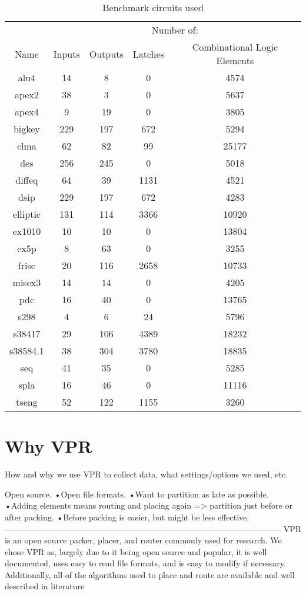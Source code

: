 \documentclass[12pt,draft,a4paper,oneside]{memoir} %
\begin{document}
\begin{table}
    \begin{tabular}{c|cccc}
     & \multicolumn{4}{c}{Number of:}\\
     Name & Inputs & Outputs & Latches & Combinational Logic Elements\\
        alu4 & 14 & 8 & 0 & 4574\\
        apex2 & 38 & 3 & 0 & 5637\\
        apex4 & 9 & 19 & 0 & 3805\\     
        bigkey & 229 & 197 & 672 & 5294\\
        clma & 62 & 82 & 99 & 25177\\
        des & 256 & 245 & 0 & 5018\\
        diffeq & 64 & 39 & 1131 & 4521\\
        dsip & 229 & 197 & 672 & 4283\\
        elliptic & 131 & 114 & 3366 & 10920\\
        ex1010 & 10 & 10 & 0 & 13804\\
        ex5p & 8 & 63 & 0 & 3255\\
        frisc & 20 & 116 & 2658 & 10733\\
        misex3 & 14 & 14 & 0 & 4205\\
        pdc & 16 & 40 & 0 & 13765\\
        s298     & 4 & 6 & 24 & 5796\\
        s38417   & 29 & 106 & 4389 & 18232\\
        s38584.1 & 38 & 304 & 3780 & 18835\\
        seq      & 41 & 35 & 0 & 5285\\
        spla     & 16 & 46 & 0 & 11116\\
        tseng    & 52 & 122 & 1155 & 3260
    \end{tabular}
    \caption{Benchmark circuits used}
    \label{benchmarkList}
\end{table}


\section{Why VPR}
How and why we use VPR to collect data, what settings/options we used, etc.

Open source.
•Open file formats.
•Want to partition as late as possible.
•Adding elements means routing and placing again => partition just before or after packing.
•Before packing is easier, but might be less effective.
-----------------------------------------------------------------------------------------------------
\ac{VPR} is an open source packer, placer, and router commonly used for research. We chose \ac{VPR} as, largely due to it being open source and popular, it is well documented, uses easy to read file formats, and is easy to modify if necessary. Additionally, all of the algorithms used to place and route are available and well described in literature 
\end{document}
